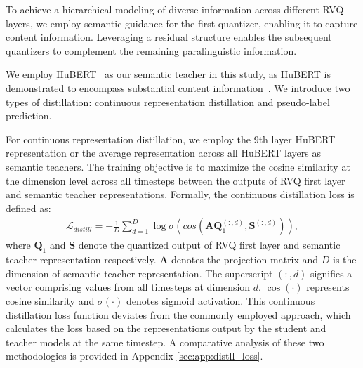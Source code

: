 
To achieve a hierarchical modeling of diverse information across different RVQ layers, we employ semantic guidance for the first quantizer, enabling it to capture content information. Leveraging a residual structure enables the subsequent quantizers to complement the remaining paralinguistic information.

We employ HuBERT~\citep{hsu2021hubert} as our semantic teacher in this study, as HuBERT is demonstrated to encompass substantial content information~\citep{Mohamed_2022}. We introduce two types of distillation: continuous representation distillation and pseudo-label prediction. 

For continuous representation distillation, we employ the 9th layer HuBERT representation or the average representation across all HuBERT layers as semantic teachers. The training objective is to maximize the cosine similarity at the dimension level across all timesteps between the outputs of RVQ first layer and semantic teacher representations. Formally, the continuous distillation loss is defined as:
\begin{align*}
    \mathcal{L}_{distill}=-\frac{1}{D}\sum_{d=1}^D\log\sigma(cos(\mathbf{AQ}_1^{(:,d)}, \mathbf{S}^{(:,d)})),
\end{align*}
where $\mathbf{Q}_1$ and $\mathbf{S}$ denote the quantized output of RVQ first layer and semantic teacher representation respectively. $\mathbf{A}$ denotes the projection matrix and $D$ is the dimension of semantic teacher representation. The superscript $(:,d)$ signifies a vector comprising values from all timesteps at dimension $d$. $\cos(\cdot)$ represents cosine similarity and $\sigma(\cdot)$ denotes sigmoid activation.  This continuous distillation loss function deviates from the commonly employed approach, which calculates the loss based on the representations output by the student and teacher models at the same timestep. A comparative analysis of these two methodologies is provided in Appendix \ref{sec:app:distll_loss}.%

